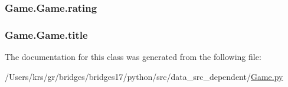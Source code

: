 \subsubsection[{rating}]{\setlength{\rightskip}{0pt plus 5cm}Game.\+Game.\+rating}\label{class_game_1_1_game_a274df8eb8d5dd182acd07582fe0f1e7e}
\hypertarget{class_game_1_1_game_aa5495f06f46f1871c8736bca793ebcbc}{}
\subsubsection[{title}]{\setlength{\rightskip}{0pt plus 5cm}Game.\+Game.\+title}\label{class_game_1_1_game_aa5495f06f46f1871c8736bca793ebcbc}


The documentation for this class was generated from the following file\+:\begin{DoxyCompactItemize}
\item 
/\+Users/krs/gr/bridges/bridges17/python/src/data\+\_\+src\+\_\+dependent/\hyperlink{_game_8py}{Game.\+py}\end{DoxyCompactItemize}
